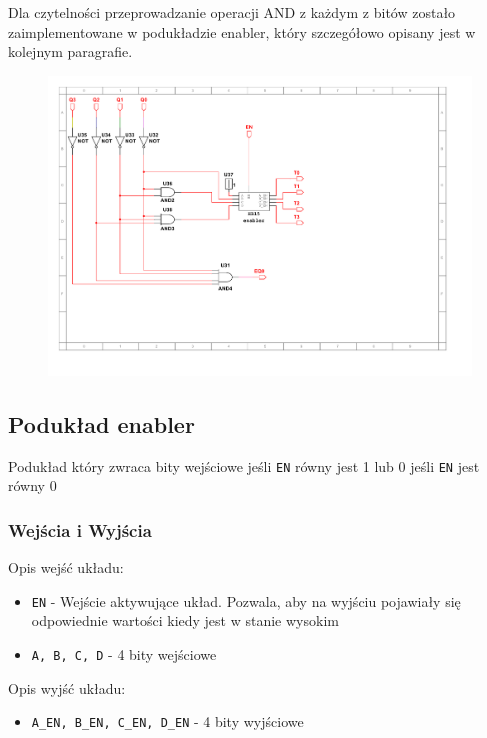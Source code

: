 \documentclass[a4paper]{article}
\begin{document}
Dla czytelności przeprowadzanie operacji AND z każdym z bitów zostało zaimplementowane w podukładzie enabler,
 który szczegółowo opisany jest w kolejnym paragrafie.


\begin{figure}[H]
    \centering
    \includegraphics[width=\textwidth]{timer_driver.pdf}
\end{figure}

\pagebreak
\subsection{Podukład enabler}
Podukład który zwraca bity wejściowe jeśli \verb|EN| równy jest 1 lub 0 jeśli \verb|EN| jest równy 0 
\subsubsection{Wejścia i Wyjścia}

Opis wejść układu:
\begin{itemize}
    \item \verb|EN| - Wejście aktywujące układ. Pozwala, aby na wyjściu pojawiały się odpowiednie wartości kiedy jest w stanie wysokim
    \item \verb|A, B, C, D| - 4 bity wejściowe 
\end{itemize}

Opis wyjść układu:

\begin{itemize}
    \item \verb|A_EN, B_EN, C_EN, D_EN| - 4 bity wyjściowe 
\end{itemize}
\end{document}
